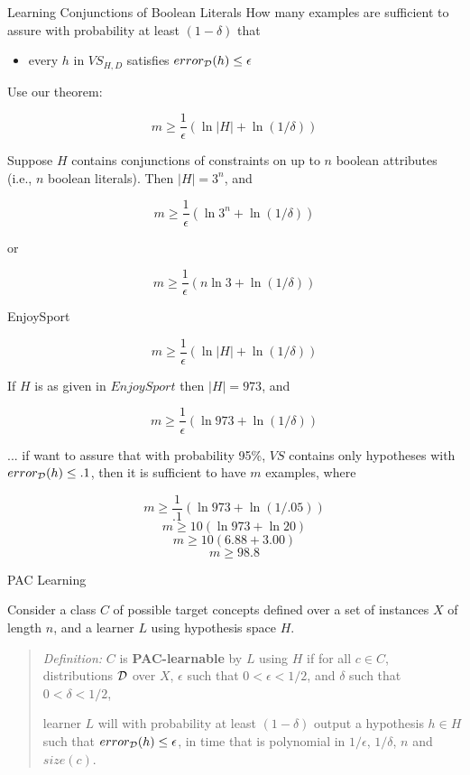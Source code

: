 \documentclass[%
pdf,
colorBG,
slideColor,
tcrico,
]{prosper}
\begin{document}
\begin{slide}{Learning Conjunctions of Boolean Literals }
\tiny 
How many examples are sufficient to assure with probability at 
least $(1 - \delta)$ that
\begin{itemize}
\item[] every $h$ in $VS_{H,D}$ satisfies $error_{\cal D}(h) \leq \epsilon$
\end{itemize}

\bigskip

Use our theorem:

\[m \geq \frac{1}{\epsilon}(\ln|H| + \ln(1/\delta)) \]

Suppose $H$ contains conjunctions of constraints on up to $n$ boolean
attributes (i.e., $n$ boolean literals).  Then $|H| = 3^n$, and

\[m \geq \frac{1}{\epsilon}(\ln 3^n + \ln(1/\delta)) \]

or

\[m \geq \frac{1}{\epsilon}(n \ln 3 + \ln(1/\delta)) \]
\end{slide}



\begin{slide}{EnjoySport }
\tiny 

\[m \geq \frac{1}{\epsilon}(\ln|H| + \ln(1/\delta)) \]


If $H$ is as given in $EnjoySport$ then $|H| = 973$, and

\[m \geq \frac{1}{\epsilon}(\ln 973 + \ln(1/\delta)) \]

... if want to assure that with probability 95\%, $VS$ contains only
hypotheses with $error_{\cal D}(h) \leq .1$, then it is sufficient to have
$m$ examples, where

\[m \geq \frac{1}{.1}(\ln 973 + \ln(1/.05)) \]
\[m \geq 10 (\ln 973 + \ln 20) \]
\[m \geq 10 (6.88 + 3.00) \]
\[m \geq 98.8 \]
\end{slide}



\begin{slide}{PAC Learning }

Consider a class $C$ of possible target concepts defined over a set of
instances $X$ of length $n$, and a learner $L$ using hypothesis space $H$.

\begin{quote}
{\em Definition:} $C$ is {\bf PAC-learnable} by $L$ using $H$ if for all $c
\in C$, distributions $\cal D$ over $X$, $\epsilon$ such that $0 < \epsilon <
1/2$, and $\delta$ such that $0 < \delta < 1/2$,

learner $L$ will with probability at least $(1-\delta)$ output a hypothesis $h
\in H$ such that $error_{\cal D}(h) \leq \epsilon$, in time that is polynomial
in $1/\epsilon$, $1/\delta$, $n$ and $size(c)$.
\end{quote}
\end{slide}
\end{document}
